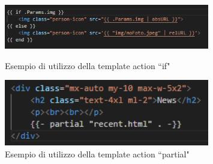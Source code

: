 \documentclass[target=bach,aauheader=]{thud}
\begin{document}
\begin{figure}[b]
    \centering
    \begin{minipage}{0.8\textwidth}
      \centering
      \includegraphics[width=0.8\textwidth]{images/if-template-actions.png}
      \caption{Esempio di utilizzo della template action ``if"}
      \label{img:if}
    \end{minipage}
    \hspace{1cm}
    \hfill
    \begin{minipage}{0.5\textwidth}
      \centering
      \includegraphics[width=0.8\textwidth]{images/partial-template-actions.png}
      \caption{Esempio di utilizzo della template action ``partial"}
      \label{img:partial}
    \end{minipage}
\end{figure}

\end{document}
